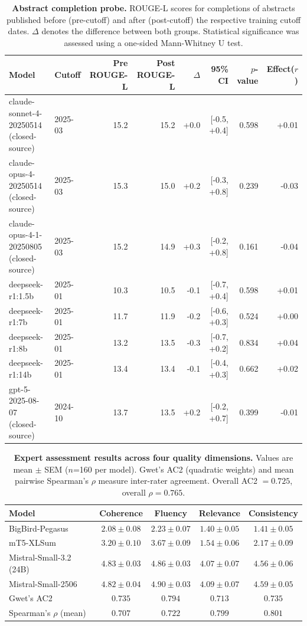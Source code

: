 \begin{table}[H]
\centering
\caption{\textbf{Abstract completion probe.} \ac{ROUGE}-L scores for completions of abstracts published before (pre-cutoff) and after (post-cutoff) the respective training cutoff dates. $\Delta$ denotes the difference between both groups. Statistical significance was assessed using a one-sided Mann-Whitney U test.}\label{tab:completion_probe}
\scriptsize
\begin{tabularx}{\linewidth}{X l r r r r r r}
\toprule
\textbf{Model} & \textbf{Cutoff} & \textbf{Pre ROUGE-L} & \textbf{Post ROUGE-L} & \textbf{$\Delta$} & \textbf{95\% CI} & \textbf{$p$-value} & \textbf{Effect($r$)} \\
\midrule
claude-sonnet-4-20250514 (closed-source) & 2025-03 & 15.2 & 15.2 & +0.0 & [-0.5, +0.4] & 0.598 & +0.01 \\
claude-opus-4-20250514 (closed-source) & 2025-03 & 15.3 & 15.0 & +0.2 & [-0.3, +0.8] & 0.239 & -0.03 \\
claude-opus-4-1-20250805 (closed-source) & 2025-03 & 15.2 & 14.9 & +0.3 & [-0.2, +0.8] & 0.161 & -0.04 \\
deepseek-r1:1.5b & 2025-01 & 10.3 & 10.5 & -0.1 & [-0.7, +0.4] & 0.598 & +0.01 \\
deepseek-r1:7b & 2025-01 & 11.7 & 11.9 & -0.2 & [-0.6, +0.3] & 0.524 & +0.00 \\
deepseek-r1:8b & 2025-01 & 13.2 & 13.5 & -0.3 & [-0.7, +0.2] & 0.834 & +0.04 \\
deepseek-r1:14b & 2025-01 & 13.4 & 13.4 & -0.1 & [-0.4, +0.3] & 0.662 & +0.02 \\
gpt-5-2025-08-07 (closed-source) & 2024-10 & 13.7 & 13.5 & +0.2 & [-0.2, +0.7] & 0.399 & -0.01 \\
\bottomrule
\end{tabularx}
\end{table}

\begin{table}[H]
\centering
\caption{\textbf{Expert assessment results across four quality dimensions.} Values are mean $\pm$ SEM ($n$=160 per model). Gwet's AC2 (quadratic weights) and mean pairwise Spearman's $\rho$ measure inter-rater agreement. Overall AC2 $= 0.725$, overall $\rho = 0.765$.}\label{tab:human_eval}
\begin{tabular}{lcccc}
\toprule
Model & Coherence & Fluency & Relevance & Consistency \\
\midrule
BigBird-Pegasus & $2.08 \pm 0.08$ & $2.23 \pm 0.07$ & $1.40 \pm 0.05$ & $1.41 \pm 0.05$ \\
mT5-XLSum & $3.20 \pm 0.10$ & $3.67 \pm 0.09$ & $1.54 \pm 0.06$ & $2.17 \pm 0.09$ \\
Mistral-Small-3.2 (24B) & $4.83 \pm 0.03$ & $4.86 \pm 0.03$ & $4.07 \pm 0.07$ & $4.56 \pm 0.06$ \\
Mistral-Small-2506 & $4.82 \pm 0.04$ & $4.90 \pm 0.03$ & $4.09 \pm 0.07$ & $4.59 \pm 0.05$ \\
\midrule
Gwet's AC2 & $0.735$ & $0.794$ & $0.713$ & $0.735$ \\
Spearman's $\rho$ (mean) & $0.707$ & $0.722$ & $0.799$ & $0.801$ \\
\bottomrule
\end{tabular}
\end{table}

